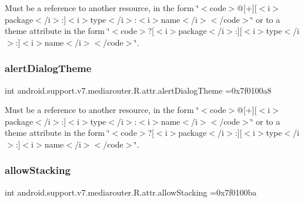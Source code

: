 Must be a reference to another resource, in the form \char`\"{}$<$code$>$@\mbox{[}+\mbox{]}\mbox{[}$<$i$>$package$<$/i$>$\+:\mbox{]}$<$i$>$type$<$/i$>$\+:$<$i$>$name$<$/i$>$$<$/code$>$\char`\"{} or to a theme attribute in the form \char`\"{}$<$code$>$?\mbox{[}$<$i$>$package$<$/i$>$\+:\mbox{]}\mbox{[}$<$i$>$type$<$/i$>$\+:\mbox{]}$<$i$>$name$<$/i$>$$<$/code$>$\char`\"{}. \mbox{\label{classandroid_1_1support_1_1v7_1_1mediarouter_1_1R_1_1attr_a49593043ae68ed908857aac991efa4fe}} 
\subsubsection{\texorpdfstring{alert\+Dialog\+Theme}{alertDialogTheme}}
{\footnotesize\ttfamily int android.\+support.\+v7.\+mediarouter.\+R.\+attr.\+alert\+Dialog\+Theme =0x7f0100a8\hspace{0.3cm}{\ttfamily [static]}}

Must be a reference to another resource, in the form \char`\"{}$<$code$>$@\mbox{[}+\mbox{]}\mbox{[}$<$i$>$package$<$/i$>$\+:\mbox{]}$<$i$>$type$<$/i$>$\+:$<$i$>$name$<$/i$>$$<$/code$>$\char`\"{} or to a theme attribute in the form \char`\"{}$<$code$>$?\mbox{[}$<$i$>$package$<$/i$>$\+:\mbox{]}\mbox{[}$<$i$>$type$<$/i$>$\+:\mbox{]}$<$i$>$name$<$/i$>$$<$/code$>$\char`\"{}. \mbox{\label{classandroid_1_1support_1_1v7_1_1mediarouter_1_1R_1_1attr_a33ad140b54a5244d27e885a1443ff302}} 
\subsubsection{\texorpdfstring{allow\+Stacking}{allowStacking}}
{\footnotesize\ttfamily int android.\+support.\+v7.\+mediarouter.\+R.\+attr.\+allow\+Stacking =0x7f0100ba\hspace{0.3cm}{\ttfamily [static]}}

